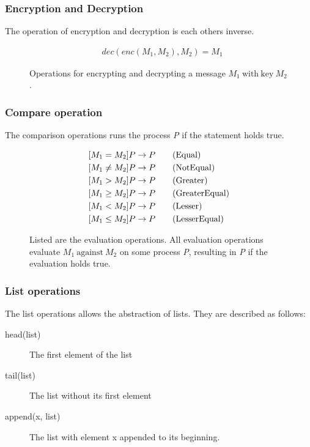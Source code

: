 \subsubsection{Encryption and Decryption}
The operation of encryption and decryption is each others inverse.
\begin{figure}[h]
    \begin{align*}
        &dec(enc(M_1, M_2),M_2) = M_1 \tag{Decrypt}
    \end{align*}
    \caption{Operations for encrypting and decrypting a message $M_1\ \mathrm{with\ key}\ M_2$.}
\end{figure}
\FloatBarrier

\subsubsection{Compare operation}
The comparison operations runs the process \textit{P} if the statement holds true.
\begin{figure}[h]
    \begin{align}
        &[M_1 = M_2]P \rightarrow P \tag{Equal}\\
        &[M_1 \neq M_2]P \rightarrow P \tag{NotEqual}\\
        &[M_1 > M_2]P \rightarrow P \tag{Greater}\\
        &[M_1 \geq M_2]P \rightarrow P \tag{GreaterEqual}\\
        &[M_1 < M_2]P \rightarrow P \tag{Lesser}\\
        &[M_1 \leq M_2]P \rightarrow P \tag{LesserEqual}
    \end{align}
    \caption{Listed are the evaluation operations. All evaluation operations evaluate $M_1\ \mathrm{against}\ M_2$ on some process \textit{P}, resulting in \textit{P} if the evaluation holds true.}
\end{figure}

\FloatBarrier

\subsubsection{List operations}

The list operations allows the abstraction of lists. They are described as follows:

\begin{description}
	\item[head(list)] The first element of the list
	\item[tail(list)] The list without its first element
	\item[append(x, list)] The list with element x appended to its beginning.
\end{description}

